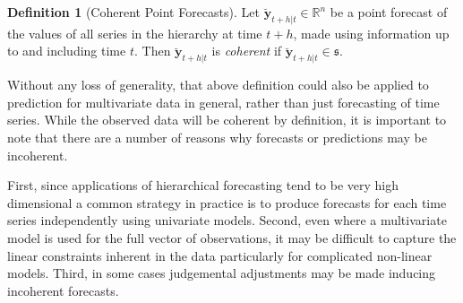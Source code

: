 \documentclass[12pt]{article}
\theoremstyle{definition}
\newtheorem{definition}{Definition}[section]
\theoremstyle{property}
\begin{document}
	
%	
	
	\begin{definition}[Coherent Point Forecasts]\label{def:cohpoint}
		Let $\breve{\bm{y}}_{t+h|t} \in \mathbb{R}^n$ be a point forecast of the values of all series in the hierarchy at time $t+h$, made using information up to and including time $t$. Then $\breve{\bm{y}}_{t+h|t}$ is \emph{coherent} if $\breve{\bm{y}}_{t+h|t} \in \mathfrak{s}$.
	\end{definition}

    Without any loss of generality, that above definition could also be applied to prediction for multivariate data in general, rather than just forecasting of time series.  While the observed data will be coherent by definition, it is important to note that there are a number of reasons why forecasts or predictions may be incoherent.      
    
    First, since applications of hierarchical forecasting tend to be very high dimensional a common strategy in practice is to produce forecasts for each time series independently using univariate models.  Second, even where a multivariate model is used for the full vector of observations, it may be difficult to capture the linear constraints inherent in the data particularly for complicated non-linear models.  Third, in some cases judgemental adjustments may be made inducing incoherent forecasts. 
	
\end{document}
